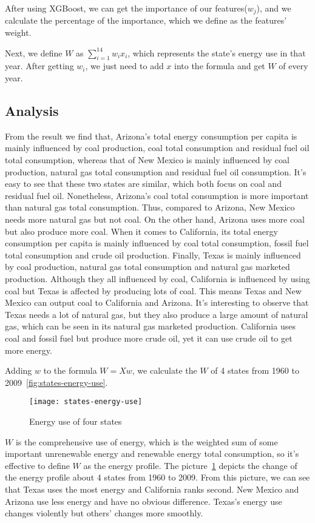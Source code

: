 \documentclass{mcmthesis}
\begin{document}
After using XGBoost, we can get the importance of our features($w_j$), and we calculate the percentage of the importance, which we define as the features' weight.

Next, we define $W$ as $\sum_{i=1}^{14} w_i x_i$, which represents the state's energy use in that year.
After getting $w_i$, we just need to add $x$ into the formula and get $W$ of every year.

\subsection{Analysis}
From the result we find that, Arizona's total energy consumption per capita is mainly influenced by coal production, coal total consumption and residual fuel oil total consumption, whereas that of New Mexico is mainly influenced by coal production, natural gas total consumption and residual fuel oil consumption.
It's easy to see that these two states are similar, which both focus on coal and residual fuel oil.
Nonetheless, Arizona's coal total consumption is more important than natural gas total consumption.
Thus, compared to Arizona, New Mexico needs more natural gas but not coal.
On the other hand, Arizona uses more coal but also produce more coal.
When it comes to California, its total energy consumption per capita is mainly influenced by coal total consumption, fossil fuel total consumption and crude oil production.
Finally, Texas is mainly influenced by coal production, natural gas total consumption and natural gas marketed production.
Although they all influenced by coal, California is influenced by using coal but Texas is affected by producing lots of coal.
This means Texas and New Mexico can output coal to California and Arizona.
It's interesting to observe that Texas needs a lot of natural gas, but they also produce a large amount of natural gas, which can be seen in its natural gas marketed production.
California uses coal and fossil fuel but produce more crude oil, yet it can use crude oil to get more energy.

Adding $w$ to the formula $W = Xw$, we calculate the $W$ of 4 states from 1960 to 2009~\eqref{fig:states-energy-use}.
\begin{figure}[!h]
     \centering
     \texttt{[image: states-energy-use]}
     \caption{Energy use of four states}
     \label{fig:states-energy-use}
\end{figure}

$W$ is the comprehensive use of energy, which is the weighted sum of some important unrenewable energy and renewable energy total consumption, so it's effective to define $W$ as the energy profile.
The picture~\ref{fig:states-energy-use} depicts the change of the energy profile about 4 states from 1960 to 2009.
From this picture, we can see that Texas uses the most energy and California ranks second.
New Mexico and Arizona use less energy and have no obvious difference.
Texas's energy use changes violently but others' changes more smoothly.
\end{document}
